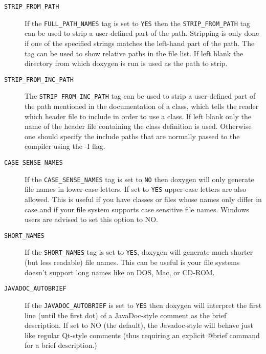 \begin{description}
\label{config_cfg_strip_from_path}
\hypertarget{config_cfg_strip_from_path}{}
 \item[{\tt STRIP\_\-FROM\_\-PATH} ] If the {\tt FULL\_\-PATH\_\-NAMES} tag is set to {\tt YES} then the {\tt STRIP\_\-FROM\_\-PATH} tag can be used to strip a user-defined part of the path. Stripping is only done if one of the specified strings matches the left-hand part of the path. The tag can be used to show relative paths in the file list. If left blank the directory from which doxygen is run is used as the path to strip.

\label{config_cfg_strip_from_inc_path}
\hypertarget{config_cfg_strip_from_inc_path}{}
 \item[{\tt STRIP\_\-FROM\_\-INC\_\-PATH} ] The {\tt STRIP\_\-FROM\_\-INC\_\-PATH} tag can be used to strip a user-defined part of the path mentioned in the documentation of a class, which tells the reader which header file to include in order to use a class. If left blank only the name of the header file containing the class definition is used. Otherwise one should specify the include paths that are normally passed to the compiler using the -I flag.

\label{config_cfg_case_sense_names}
\hypertarget{config_cfg_case_sense_names}{}
 \item[{\tt CASE\_\-SENSE\_\-NAMES} ] If the {\tt CASE\_\-SENSE\_\-NAMES} tag is set to {\tt NO} then doxygen will only generate file names in lower-case letters. If set to {\tt YES} upper-case letters are also allowed. This is useful if you have classes or files whose names only differ in case and if your file system supports case sensitive file names. Windows users are advised to set this option to NO.

\label{config_cfg_short_names}
\hypertarget{config_cfg_short_names}{}
 \item[{\tt SHORT\_\-NAMES} ] If the {\tt SHORT\_\-NAMES} tag is set to {\tt YES}, doxygen will generate much shorter (but less readable) file names. This can be useful is your file systems doesn't support long names like on DOS, Mac, or CD-ROM.

\label{config_cfg_javadoc_autobrief}
\hypertarget{config_cfg_javadoc_autobrief}{}
 \item[{\tt JAVADOC\_\-AUTOBRIEF} ] If the {\tt JAVADOC\_\-AUTOBRIEF} is set to {\tt YES} then doxygen will interpret the first line (until the first dot) of a JavaDoc-style comment as the brief description. If set to NO (the default), the Javadoc-style will behave just like regular Qt-style comments (thus requiring an explicit @brief command for a brief description.)


\end{description}
